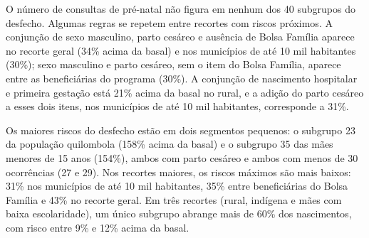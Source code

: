 O número de consultas de pré-natal não figura em nenhum dos 40 subgrupos do desfecho.
Algumas regras se repetem entre recortes com riscos próximos. A conjunção de sexo masculino, parto cesáreo e ausência de Bolsa Família aparece no recorte geral (34\% acima da basal) e nos municípios de até 10 mil habitantes (30\%); sexo masculino e parto cesáreo, sem o item do Bolsa Família, aparece entre as beneficiárias do programa (30\%). A conjunção de nascimento hospitalar e primeira gestação está 21\% acima da basal no rural, e a adição do parto cesáreo a esses dois itens, nos municípios de até 10 mil habitantes, corresponde a 31\%.

Os maiores riscos do desfecho estão em dois segmentos pequenos: o subgrupo 23 da população quilombola (158\% acima da basal) e o subgrupo 35 das mães menores de 15 anos (154\%), ambos com parto cesáreo e ambos com menos de 30 ocorrências (27 e 29). Nos recortes maiores, os riscos máximos são mais baixos: 31\% nos municípios de até 10 mil habitantes, 35\% entre beneficiárias do Bolsa Família e 43\% no recorte geral. Em três recortes (rural, indígena e mães com baixa escolaridade), um único subgrupo abrange mais de 60\% dos nascimentos, com risco entre 9\% e 12\% acima da basal.

\FloatBarrier
